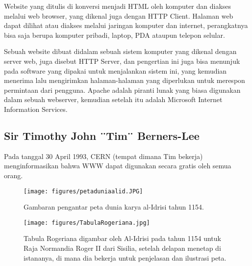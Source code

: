 Website yang ditulis di konversi menjadi HTML oleh komputer dan diakses melalui web browser, yang dikenal juga dengan HTTP Client. Halaman web dapat dilihat atau diakses melalui jaringan komputer dan internet, perangkatnya bisa saja berupa komputer pribadi, laptop, PDA ataupun telepon selular.

Sebuah website dibuat didalam sebuah sistem komputer yang dikenal dengan server web, juga disebut HTTP Server, dan pengertian ini juga bisa menunjuk pada software yang dipakai untuk menjalankan sistem ini, yang kemudian menerima lalu mengirimkan halaman-halaman yang diperlukan untuk merespon permintaan dari pengguna. Apache adalah piranti lunak yang biasa digunakan dalam sebuah webserver, kemudian setelah itu adalah Microsoft Internet Information Services.



\subsection{Sir Timothy John ¨Tim¨ Berners-Lee}
Pada tanggal 30 April 1993, CERN (tempat dimana Tim bekerja) menginformasikan bahwa WWW dapat digunakan secara gratis oleh semua orang.

\begin{figure}[ht]

\centerline{\texttt{[image: figures/petaduniaalid.JPG]}}
\caption{Gambaran pengantar peta dunia karya al-Idrisi tahun 1154.}
\end{figure}

\begin{figure}[ht]
	\centerline{\texttt{[image: figures/TabulaRogeriana.jpg]}}
\vskip2pt
\caption{Tabula Rogeriana digambar oleh Al-Idrisi pada tahun 1154 untuk Raja Normandia Roger II dari Sisilia, setelah delapan menetap di istananya, di mana dia bekerja untuk penjelasan dan ilustrasi peta.}
\end{figure}


